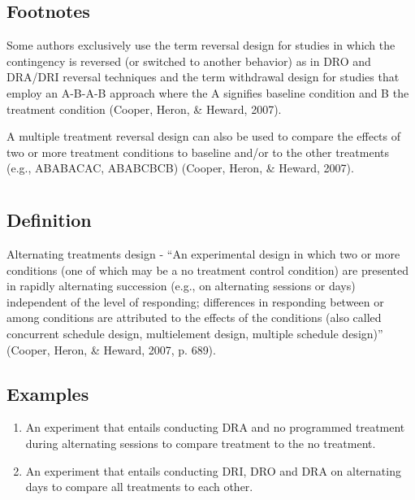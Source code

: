 \subsection{Footnotes}
Some authors exclusively use the term reversal design for studies in which the contingency is reversed  (or switched to another behavior) as in DRO and DRA/DRI reversal techniques and the term withdrawal design for studies that employ an A-B-A-B approach where the A signifies baseline condition and B the treatment condition (Cooper, Heron, \& Heward, 2007). 

A multiple treatment reversal design can also be used to compare the effects of two or more treatment conditions to baseline and/or to the other treatments (e.g., ABABACAC, ABABCBCB) (Cooper, Heron, \& Heward, 2007).
%
%
%
%
%
%
%
%
\section[\fourbFive{}]{\fourbFive{}%
              }
\subsection{Definition} 
Alternating treatments design - ``An experimental design in which two or more conditions (one of which may be a no treatment control condition) are presented in rapidly alternating succession (e.g., on alternating sessions or days) independent of the level of responding; differences in responding between or among conditions are attributed to the effects of the conditions (also called concurrent schedule design, multielement design, multiple schedule design)'' (Cooper, Heron, \& Heward, 2007, p. 689).
%
\subsection{Examples}
\begin{enumerate}
\item An experiment that entails conducting DRA and no programmed treatment during alternating sessions to compare treatment to the no treatment. 
\item An experiment that entails conducting DRI, DRO and DRA on alternating days to compare all treatments to each other. 
\end{enumerate}
%
